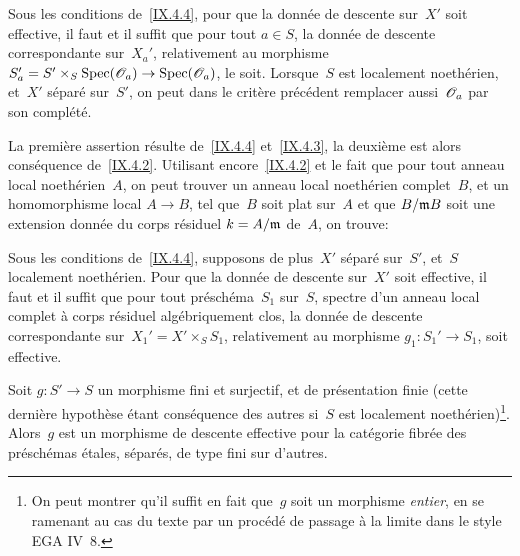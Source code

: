 \begin{corollaire}
\label{IX.4.5}
Sous les conditions de~\ref{IX.4.4}, pour que la donn\'ee de
descente sur~$X'$ soit effective, il faut et il suffit que pour tout
$a\in S$, la donn\'ee de descente correspondante sur~$X_a'$,
relativement au morphisme
$S_a'=S'\times_S\Spec(\cal{O}_a)\to\Spec(\cal{O}_a)$, le soit.
Lorsque~$S$ est localement noeth\'erien, et~$X'$ s\'epar\'e
sur~$S'$, on peut dans le crit\`ere pr\'ec\'edent remplacer
aussi~$\cal{O}_a$ par son compl\'et\'e.
\end{corollaire}

La
premi\`ere assertion r\'esulte de~\ref{IX.4.4} et~\ref{IX.4.3}, la
deuxi\`eme est alors cons\'equence de~\ref{IX.4.2}. Utilisant
encore~\ref{IX.4.2} et le fait que pour tout anneau local
noeth\'erien~$A$, on peut trouver un anneau local noeth\'erien
complet~$B$, et un homomorphisme local $A\to B$, tel que~$B$ soit plat
sur~$A$ et que $B/\mathfrak{m}B$ soit une extension donn\'ee du corps
r\'esiduel $k=A/\mathfrak{m}$ de~$A$, on trouve:

\begin{corollaire}
\label{IX.4.6}
Sous les conditions de~\ref{IX.4.4}, supposons de plus~$X'$
s\'epar\'e sur~$S'$, et~$S$ localement noeth\'erien. Pour que la
donn\'ee de descente sur~$X'$ soit effective, il faut et il suffit
que pour tout pr\'esch\'ema~$S_1$ sur~$S$, spectre d'un anneau
local complet \`a corps r\'esiduel alg\'ebriquement clos, la
donn\'ee de descente correspondante sur~$X_1'=X'\times_S S_1$,
relativement au morphisme $g_1\colon S_1'\to S_1$, soit effective.
\end{corollaire}

\begin{theoreme}
\label{IX.4.7}
Soit $g\colon S'\to S$ un morphisme fini et surjectif, et de
pr\'esentation finie (cette derni\`ere hypoth\`ese \'etant
cons\'equence des autres si~$S$ est localement
noeth\'erien)\footnote{On peut montrer qu'il suffit en fait que~$g$
soit un morphisme \emph{entier}, en se ramenant au cas du texte par un
proc\'ed\'e de passage \`a la limite dans le style EGA IV~8.}.
Alors~$g$ est un morphisme de descente effective pour la cat\'egorie
fibr\'ee des pr\'esch\'emas \'etales, s\'epar\'es, de type
fini sur d'autres.
\end{theoreme}

